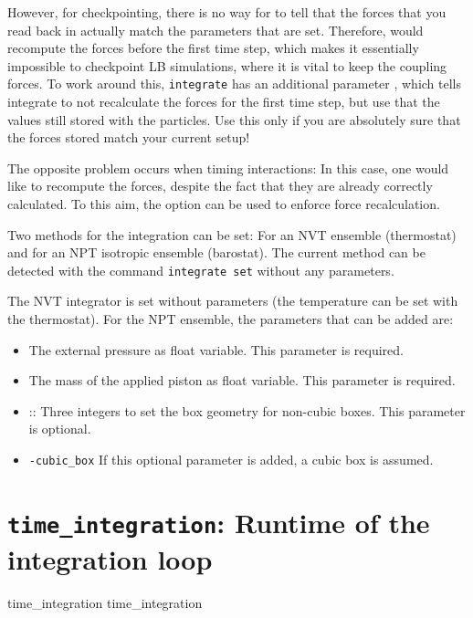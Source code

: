 However, for checkpointing, there is no way for \es{} to tell that the forces that you
read back in actually match the parameters that are set. Therefore, \es{} would recompute
the forces before the first time step, which makes it essentially impossible to checkpoint
LB simulations, where it is vital to keep the coupling forces. To work
around this, \texttt{integrate}
has an additional parameter , which tells integrate to not recalculate
the forces for the first time step, but use that the values still stored with the particles.
Use this only if you are absolutely sure that the forces stored match your current setup!

The opposite problem occurs when timing interactions: In this case,
one would like to recompute the forces, despite the fact that they are
already correctly calculated. To this aim, the option
 can be used to enforce force recalculation.

Two methods for the integration can be set: For an NVT ensemble
(thermostat) and for an NPT isotropic ensemble (barostat). The current
method can be detected with the command \texttt{integrate set} without
any parameters.

The NVT integrator is set without parameters (the temperature can be
set with the thermostat). For the NPT ensemble, the parameters that
can be added are:

\begin{itemize}
\item {} The external pressure as float variable. This
  parameter is required.
\item {} The mass of the applied piston as float
  variable. This parameter is required.
\item {}:: Three integers to set the box geometry for
  non-cubic boxes. This parameter is optional.
\item \texttt{-cubic_box} If this optional parameter is added, a cubic
  box is assumed.
\end{itemize}

\section{\texttt{time_integration}: Runtime of the integration loop}

\begin{essyntax}
   time_integration
   time_integration 
\end{essyntax}

